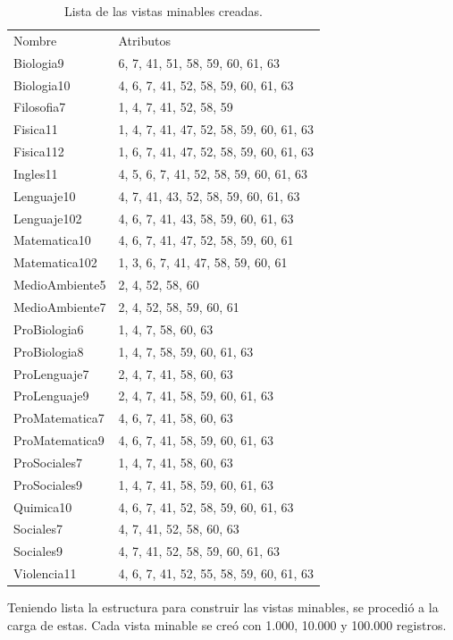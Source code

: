 \begin{table}[!Hhtb]
\centering
\begin{tabular}{|p{3.5cm}|p{7cm}|}
\hline
	\rowcolor[gray]{0.9} 
	\multicolumn{2}{|c|}{
	\textbf{Vistas minables}}\\
\hline
	\rowcolor[gray]{0.5}
	Nombre & Atributos\\
\hline
Biologia9 & 6, 7, 41, 51, 58, 59, 60, 61, 63 \\
\hline
Biologia10 & 4, 6, 7, 41, 52, 58, 59, 60, 61, 63 \\
\hline
Filosofia7 & 1, 4, 7, 41, 52, 58, 59 \\
\hline
Fisica11 & 1, 4, 7, 41, 47, 52, 58, 59, 60, 61, 63 \\
\hline
Fisica112 & 1, 6, 7, 41, 47, 52, 58, 59, 60, 61, 63 \\
\hline
Ingles11 & 4, 5, 6, 7, 41, 52, 58, 59, 60, 61, 63 \\
\hline
Lenguaje10 & 4, 7, 41, 43, 52, 58, 59, 60, 61, 63 \\
\hline
Lenguaje102 & 4, 6, 7, 41, 43, 58, 59, 60, 61, 63 \\
\hline
Matematica10 & 4, 6, 7, 41, 47, 52, 58, 59, 60, 61 \\
\hline
Matematica102 & 1, 3, 6, 7, 41, 47, 58, 59, 60, 61 \\
\hline
MedioAmbiente5 & 2, 4, 52, 58, 60 \\
\hline
MedioAmbiente7 & 2, 4, 52, 58, 59, 60, 61 \\
\hline
ProBiologia6 & 1, 4, 7, 58, 60, 63 \\
\hline
ProBiologia8 & 1, 4, 7, 58, 59, 60, 61, 63 \\
\hline
ProLenguaje7 & 2, 4, 7, 41, 58, 60, 63 \\
\hline
ProLenguaje9 & 2, 4, 7, 41, 58, 59, 60, 61, 63 \\
\hline
ProMatematica7 & 4, 6, 7, 41, 58, 60, 63 \\
\hline
ProMatematica9 & 4, 6, 7, 41, 58, 59, 60, 61, 63 \\
\hline
ProSociales7 & 1, 4, 7, 41, 58, 60, 63 \\
\hline
ProSociales9 & 1, 4, 7, 41, 58, 59, 60, 61, 63 \\
\hline
Quimica10 & 4, 6, 7, 41, 52, 58, 59, 60, 61, 63 \\
\hline
Sociales7 & 4, 7, 41, 52, 58, 60, 63  \\
\hline
Sociales9 & 4, 7, 41, 52, 58, 59, 60, 61, 63  \\
\hline
Violencia11 & 4, 6, 7, 41, 52, 55, 58, 59, 60, 61, 63 \\
\hline
\end{tabular}
\caption{Lista de las vistas minables creadas.}
\label{tab:cuadro32}
\end{table}
Teniendo lista la estructura para construir las vistas minables, se procedió a la carga de estas. Cada vista minable se creó con 1.000, 10.000 y 100.000 registros.

